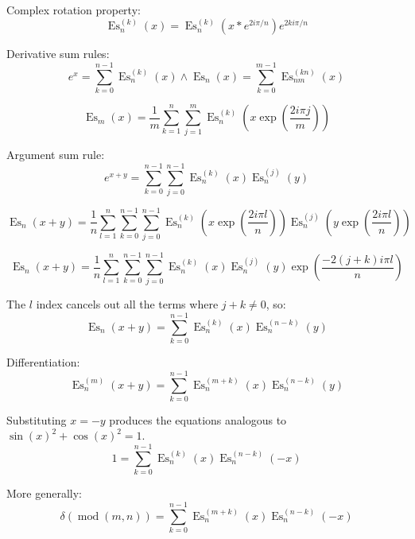 \documentclass[]{article}
\DeclareMathOperator{\es}{Es}
\DeclareMathOperator{\md}{mod}
\newcommand{\pqty}[1]{{\left(#1\right)}}
\begin{document}
	Complex rotation property:
	\begin{equation}
	\es_n^{(k)}\pqty{x}=
	\es_n^{(k)}\pqty{x*e^{2i\pi/n}}e^{2ki\pi/n}
	\end{equation}
	
	Derivative sum rules:
	\begin{equation}
	e^x=\sum_{k=0}^{n-1}\es_n^{(k)}\pqty{x}\land\es_n\pqty{x}=\sum_{k=0}^{m-1}\es_{nm}^{(kn)}\pqty{x}
	\end{equation}
	
	\begin{equation}
	\es_m\pqty{x}=
	\frac{1}{m}
	\sum_{k=1}^{n}\sum_{j=1}^{m}\es_n^{(k)}\pqty{x\exp\pqty{\frac{2 i \pi j}{m}}}
	\end{equation}
	
	Argument sum rule:
	\begin{equation}
	e^{x+y}=\sum_{k=0}^{n-1}\sum_{j=0}^{n-1}\es_n^{(k)}\pqty{x}\es_n^{(j)}\pqty{y}
	\end{equation}
	
	\begin{equation}
	\es_n\pqty{x+y}=
	\frac{1}{n}\sum _{l=1}^n \sum_{k=0}^{n-1}\sum_{j=0}^{n-1}
	\es_n^{(k)}\pqty{x\exp\pqty{\frac{2 i \pi  l}{n}}}
	\es_n^{(j)}\pqty{y\exp\pqty{\frac{2 i \pi  l}{n}}}
	\end{equation}
	
	\begin{equation}
	\es_n\pqty{x+y}=
	\frac{1}{n}\sum _{l=1}^n \sum_{k=0}^{n-1}\sum_{j=0}^{n-1}
	\es_n^{(k)}\pqty{x}
	\es_n^{(j)}\pqty{y}
	\exp\pqty{\frac{-2(j+k) i \pi  l}{n}}
	\end{equation}
	
	The \(l\) index cancels out all the terms where \(j+k\neq 0\), so:
	\begin{equation}
	\es_n\pqty{x+y}=
	\sum_{k=0}^{n-1}
	\es_n^{(k)}\pqty{x}
	\es_n^{(n-k)}\pqty{y}
	\end{equation}
	
	Differentiation:
	\begin{equation}
	\es_n^{(m)}\pqty{x+y}=
	\sum_{k=0}^{n-1}
	\es_n^{(m+k)}\pqty{x}
	\es_n^{(n-k)}\pqty{y}
	\end{equation}

	Substituting $x=-y$ produces the equations analogous to $\sin\pqty{x}^2 + \cos\pqty{x}^2=1$.
	\begin{equation}
	1=
	\sum_{k=0}^{n-1}
	\es_n^{(k)}\pqty{x}
	\es_n^{(n-k)}\pqty{-x}
	\end{equation}
	
	More generally:
	\begin{equation}
	\delta\pqty{\md\pqty{m,n}}=
	\sum_{k=0}^{n-1}
	\es_n^{(m+k)}\pqty{x}
	\es_n^{(n-k)}\pqty{-x}
	\end{equation}
	
\end{document}
